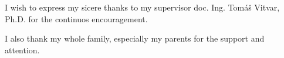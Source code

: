 I wish to express my sicere thanks to my supervisor doc. Ing. Tomáš Vitvar, Ph.D. for the continuos encouragement.

I also thank my whole family, especially my parents for the support and attention.
